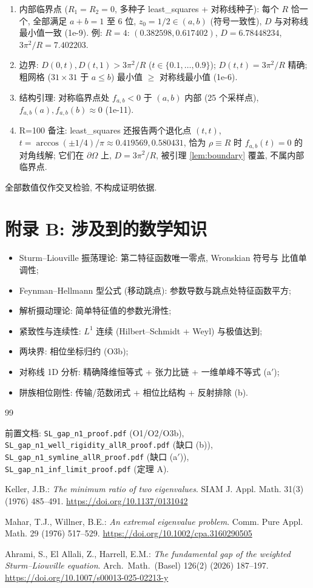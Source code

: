 \documentclass[UTF8]{ctexart}
\begin{document}
\begin{enumerate}
	\item 内部临界点 ($R_1=R_2=0$, 多种子 least\_squares + 对称线种子):
		每个 $R$ 恰一个, 全部满足 $a+b=1$ 至 6 位, $z_0=1/2\in(a,b)$
		(符号一致性), $D$ 与对称线最小值一致 (1e-9). 例: $R=4$:
		$(0.382598,0.617402)$, $D=6.78448234$, $3\pi^2/R=7.402203$.
	\item 边界: $D(0,t),D(t,1)>3\pi^2/R$ ($t\in\{0.1,\dots,0.9\}$);
		$D(t,t)=3\pi^2/R$ 精确; 粗网格 ($31\times31$ 于 $a\le b$) 最小值
		$\ge$ 对称线最小值 (1e-6).
	\item 结构引理: 对称临界点处 $f_{a,b}<0$ 于 $(a,b)$ 内部 (25 个采样点),
		$f_{a,b}(a),f_{a,b}(b)\approx0$ (1e-11).
	\item R=100 备注: least\_squares 还报告两个退化点
		$(t,t)$, $t=\arccos(\pm1/4)/\pi\approx0.419569,0.580431$,
		恰为 $\rho\equiv R$ 时 $f_{a,b}(t)=0$ 的对角线解; 它们在
		$\partial\Omega$ 上, $D=3\pi^2/R$, 被引理 \ref{lem:boundary} 覆盖,
		不属内部临界点.
\end{enumerate}
全部数值仅作交叉检验, 不构成证明依据.

\section{附录 B: 涉及到的数学知识}

\begin{itemize}
	\item Sturm--Liouville 振荡理论: 第二特征函数唯一零点, Wronskian 符号与
		比值单调性;
	\item Feynman--Hellmann 型公式 (移动跳点): 参数导数与跳点处特征函数平方;
	\item 解析摄动理论: 简单特征值的参数光滑性;
	\item 紧致性与连续性: $L^1$ 连续 (Hilbert--Schmidt + Weyl) 与极值达到;
	\item 两块界: 相位坐标归约 (O3b);
	\item 对称线 1D 分析: 精确降维恒等式 + 张力比链 + 一维单峰不等式 (a$'$);
	\item 阱族相位刚性: 传输/范数闭式 + 相位比结构 + 反射排除 (b).
\end{itemize}

\begin{thebibliography}{99}
	\item 前置文档: \texttt{SL\_gap\_n1\_proof.pdf} (O1/O2/O3b),
		\texttt{SL\_gap\_n1\_well\_rigidity\_allR\_proof.pdf} (缺口 (b)),
		\texttt{SL\_gap\_n1\_symline\_allR\_proof.pdf} (缺口 (a$'$)),
		\texttt{SL\_gap\_n1\_inf\_limit\_proof.pdf} (定理 A).
	\item Keller, J.B.: \emph{The minimum ratio of two eigenvalues}.
		SIAM J. Appl. Math. 31(3) (1976) 485--491.
		\url{https://doi.org/10.1137/0131042}
	\item Mahar, T.J., Willner, B.E.: \emph{An extremal eigenvalue problem}.
		Comm. Pure Appl. Math. 29 (1976) 517--529.
		\url{https://doi.org/10.1002/cpa.3160290505}
	\item Ahrami, S., El Allali, Z., Harrell, E.M.: \emph{The fundamental gap
		of the weighted Sturm--Liouville equation}. Arch.\ Math.\ (Basel)
		126(2) (2026) 187--197.
		\url{https://doi.org/10.1007/s00013-025-02213-y}
\end{thebibliography}
\end{document}
